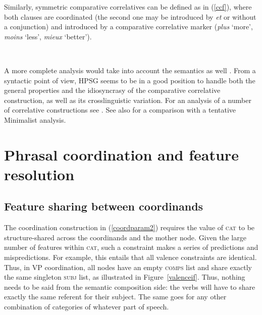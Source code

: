 \noindent
Similarly,  symmetric  comparative correlatives can be  defined as in (\ref{ccf}), where
both clauses are coordinated (the second one may be introduced by \emph{et} or without a conjunction) and
introduced by a comparative correlative marker (\emph{plus} `more', \emph{moins} `less',
\emph{mieux} `better'). 

\ea
\label{ccf}
 \impl\\ %
\z

A more complete analysis would take into account the semantics as well \citep[Section~5.5]{fgsag08}. From a syntactic point of view, HPSG seems to be in a good position to handle both the general properties and the idiosyncrasy of the comparative correlative construction, as well as its crosslinguistic variation. 
For an analysis of a number of  correlative constructions see \citet{Alqurashi:Borsley:14}.
See also  \citet{Borsley:11} for a comparison with a tentative Minimalist analysis.%

\section{Phrasal coordination and feature resolution}

\subsection{Feature sharing between coordinands}

The coordination construction in (\ref{coordparam2}) requires the value of \textsc{cat} to be structure-shared across the coordinands and the mother node. Given the large number of features within \textsc{cat}, such a constraint makes a series of predictions and mispredictions.
For example, this entails that all valence constraints are identical. Thus, in VP coordination, all nodes have an empty \textsc{comps} list and share exactly the same singleton \textsc{subj} list, as illustrated in Figure~\ref{valenceif}. Thus, nothing needs to be said from the semantic composition side: the verbs will have to share exactly the same referent for their subject. The same goes for any other combination of categories of whatever part of speech.

